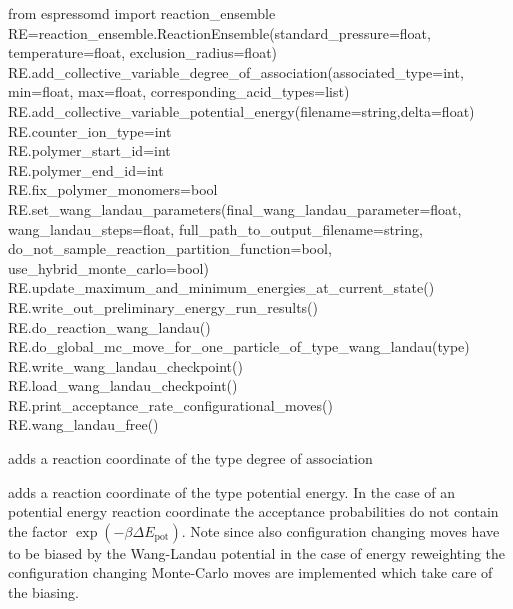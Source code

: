   \begin{pysyntax}
  	from espressomd import reaction_ensemble \\
  	RE=reaction_ensemble.ReactionEnsemble(standard_pressure=float, temperature=float, exclusion_radius=float) \\
	 RE.add_collective_variable_degree_of_association(associated_type=int, min=float, max=float, corresponding_acid_types=list) \\
	 RE.add_collective_variable_potential_energy(filename=string,delta=float) \\
	 RE.counter_ion_type=int \\
	 RE.polymer_start_id=int \\
	 RE.polymer_end_id=int \\
	 RE.fix_polymer_monomers=bool \\
	     RE.set_wang_landau_parameters(final_wang_landau_parameter=float, wang_landau_steps=float, full_path_to_output_filename=string, do_not_sample_reaction_partition_function=bool, use_hybrid_monte_carlo=bool) \\
	 RE.update_maximum_and_minimum_energies_at_current_state() \\
	 RE.write_out_preliminary_energy_run_results() \\
	 RE.do_reaction_wang_landau() \\
	 RE.do_global_mc_move_for_one_particle_of_type_wang_landau(type) \\
	 RE.write_wang_landau_checkpoint() \\
	 RE.load_wang_landau_checkpoint() \\
	 RE.print_acceptance_rate_configurational_moves() \\
	 RE.wang_landau_free()
	\begin{features}
	\end{features}
\end{pysyntax}

 adds a reaction coordinate of the type degree of association

 adds a reaction coordinate of the type potential energy. In the case of an potential energy reaction coordinate the acceptance probabilities do not contain the factor $\exp(-\beta \Delta E_\text{pot})$. Note since
also configuration changing moves have to be biased by the Wang-Landau
potential in the case of energy reweighting the configuration changing
Monte-Carlo moves are implemented which take care of the biasing. 

